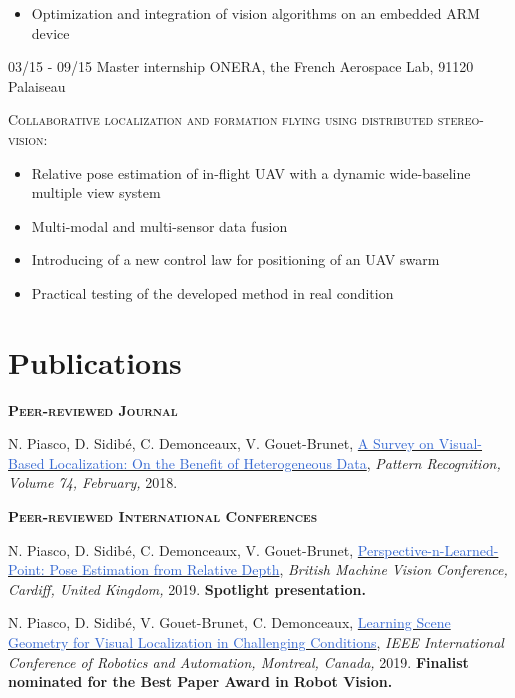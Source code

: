 \documentclass[]{friggeri-cv-cust}
\begin{document}
\begin{entrylist}
{\begin{itemize}[label=$\rhd$]
        \item Optimization and integration of vision algorithms on an embedded ARM device
    \end{itemize}\vspace{5pt}}
  \entry
    {03/15 - 09/15}
    {Master internship}
    {ONERA, the French Aerospace Lab, 91120 Palaiseau}
    {\textsc{Collaborative localization and formation ﬂying using distributed stereo-vision:}
    \begin{itemize}[label=$\rhd$]
    	\item Relative pose estimation of in-flight UAV with a dynamic wide-baseline multiple view system
    	\item Multi-modal and multi-sensor data fusion
        \item Introducing of a new control law for positioning of an UAV swarm 
        \item Practical testing of the developed method in real condition
    \end{itemize} \vspace{5pt}}
\end{entrylist}

\newpage
\section{Publications}
    \textsc{\textbf{Peer-reviewed Journal}}
    
    {\footnotesize{N. Piasco, D. Sidibé, C. Demonceaux, V. Gouet-Brunet, \href{http://recherche.ign.fr/labos/matis/pdf/articles_revues/2017/PSDG17.pdf}{\textcolor{highlight}{A Survey on Visual-Based Localization: On the Benefit of Heterogeneous Data}},
\textit{Pattern Recognition, Volume 74, February,} 2018.}}
	
	\vspace{0.5cm}
    \textsc{\textbf{Peer-reviewed International Conferences}}
   
    {\footnotesize{N. Piasco, D. Sidibé, C. Demonceaux, V. Gouet-Brunet, \href{}{\textcolor{highlight}{Perspective-n-Learned-Point: Pose Estimation from Relative Depth}},
    \textit{British Machine Vision Conference, Cardiff, United Kingdom,} 2019. \textbf{Spotlight presentation.}}}
        
    
    {\footnotesize{N. Piasco, D. Sidibé, V. Gouet-Brunet, C. Demonceaux, \href{http://recherche.ign.fr/labos/matis/pdf/articles_conf/2019/root.pdf}{\textcolor{highlight}{Learning Scene Geometry for Visual Localization in Challenging Conditions}},
\textit{IEEE International Conference of Robotics and Automation, Montreal, Canada,} 2019. \textbf{Finalist nominated for the Best Paper Award in Robot Vision.}}}
\end{document}
